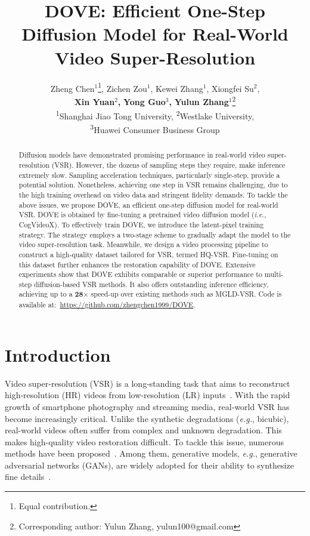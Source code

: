\documentclass{article}
\title{DOVE: Efficient One-Step Diffusion Model for Real-World Video Super-Resolution}
\author{
  Zheng Chen$^{1}$\thanks{Equal contribution.},\enspace 
  Zichen Zou$^{1}$\footnotemark[1],\enspace 
  Kewei Zhang$^{1}$,\enspace 
  Xiongfei Su$^{2}$,\enspace \\
  \textbf{Xin Yuan$^{2}$,}\enspace 
  \textbf{Yong Guo$^{3}$,}\enspace 
  \textbf{Yulun Zhang$^{1}$}\thanks{Corresponding author: Yulun Zhang, yulun100@gmail.com} \\
  \textsuperscript{1}Shanghai Jiao Tong University,\enspace
  \textsuperscript{2}Westlake University,\enspace\\
  \textsuperscript{3}Huawei Consumer Business Group
  \vspace{-5.mm}
}
\newcommand\eg{\textit{e.g.}}
\newcommand\ie{\textit{i.e.}}
\begin{document}
\maketitle

\begin{abstract}
Diffusion models have demonstrated promising performance in real-world video super-resolution (VSR). However, the dozens of sampling steps they require, make inference extremely slow. Sampling acceleration techniques, particularly single-step, provide a potential solution. Nonetheless, achieving one step in VSR remains challenging, due to the high training overhead on video data and stringent fidelity demands. To tackle the above issues, we propose DOVE, an efficient one-step diffusion model for real-world VSR. DOVE is obtained by fine-tuning a pretrained video diffusion model (\ie, CogVideoX). To effectively train DOVE, we introduce the latent-pixel training strategy. The strategy employs a two-stage scheme to gradually adapt the model to the video super-resolution task. Meanwhile, we design a video processing pipeline to construct a high-quality dataset tailored for VSR, termed HQ-VSR. Fine-tuning on this dataset further enhances the restoration capability of DOVE. Extensive experiments show that DOVE exhibits comparable or superior performance to multi-step diffusion-based VSR methods. It also offers outstanding inference efficiency, achieving up to a \textbf{28$\times$} speed-up over existing methods such as MGLD-VSR. Code is available at:~\url{https://github.com/zhengchen1999/DOVE}.
\end{abstract}

\setlength{\abovedisplayskip}{2pt}
\setlength{\belowdisplayskip}{2pt}

\vspace{-4.mm}
\section{Introduction}
\vspace{-3.mm}
Video super‑resolution (VSR) is a long‑standing task that aims to reconstruct high‑resolution (HR) videos from low‑resolution (LR) inputs~\cite{jo2018deep,liang2024vrt}. With the rapid growth of smartphone photography and streaming media, real‑world VSR has become increasingly critical. Unlike the synthetic degradations (\eg, bicubic), real-world videos often suffer from complex and unknown degradation. This makes high-quality video restoration difficult. 
To tackle this issue, numerous methods have been proposed~\cite{yang2021real,pan2021deep,wang2023benchmark,xie2023mitigating,zhang2024realviformer}. 
Among them, generative models, \eg, generative adversarial networks (GANs), are widely adopted for their ability to synthesize fine details~\cite{goodfellow2014generative,lucas2019generative,chan2022investigating}. 
\end{document}
